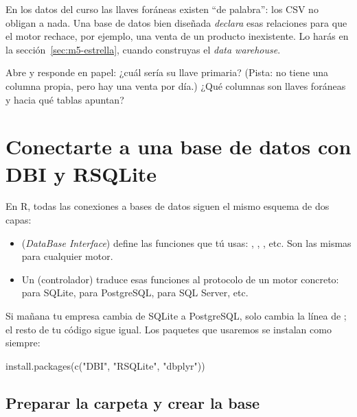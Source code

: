 \begin{advertencia}
En los datos del curso las llaves foráneas existen ``de palabra'': los CSV
no obligan a nada. Una base de datos bien diseñada \emph{declara} esas
relaciones para que el motor rechace, por ejemplo, una venta de un producto
inexistente. Lo harás en la sección~\ref{sec:m5-estrella}, cuando construyas
el \emph{data warehouse}.
\end{advertencia}

\begin{hazlotu}
Abre  y responde en papel: ¿cuál sería su llave
primaria? (Pista: no tiene una columna  propia, pero hay una
venta por día.) ¿Qué columnas son llaves foráneas y hacia qué tablas
apuntan?
\end{hazlotu}

\section{Conectarte a una base de datos con DBI y RSQLite}
\label{sec:m5-dbi}

En R, todas las conexiones a bases de datos siguen el mismo esquema de dos
capas:

\begin{itemize}
  \item {} (\emph{DataBase Interface}) define las funciones que
        tú usas: , ,
        , etc. Son las mismas para cualquier motor.
  \item Un  (controlador) traduce esas funciones al
        protocolo de un motor concreto:  para SQLite,
         para PostgreSQL,  para SQL Server,
        etc.
\end{itemize}

Si mañana tu empresa cambia de SQLite a PostgreSQL, solo cambia la línea de
; el resto de tu código sigue igual. Los paquetes que
usaremos se instalan como siempre:

\begin{rnoejecutar}
install.packages(c("DBI", "RSQLite", "dbplyr"))
\end{rnoejecutar}

\subsection{Preparar la carpeta y crear la base}

